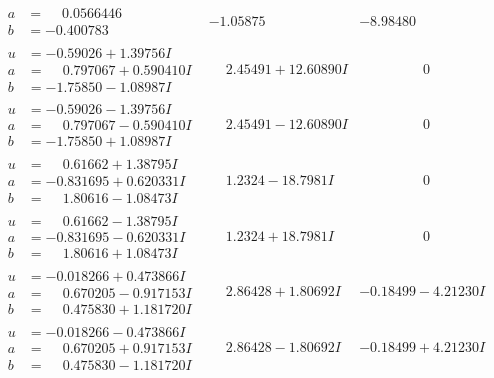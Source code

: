 \documentclass[1p]{elsarticle_modified}
\theoremstyle{definition}
\begin{document}
$$\begin{array}{c|c|c}
\begin{aligned}
a &= \phantom{-}0.0566446\phantom{ +0.000000I} \\
b &= -0.400783\phantom{ +0.000000I}\end{aligned}
 & -1.05875\phantom{ +0.000000I} & -8.98480\phantom{ +0.000000I} \\ \hline\begin{aligned}
u &= -0.59026 + 1.39756 I \\
a &= \phantom{-}0.797067 + 0.590410 I \\
b &= -1.75850 - 1.08987 I\end{aligned}
 & \phantom{-}2.45491 + 12.60890 I & \phantom{-0.000000 } 0 \\ \hline\begin{aligned}
u &= -0.59026 - 1.39756 I \\
a &= \phantom{-}0.797067 - 0.590410 I \\
b &= -1.75850 + 1.08987 I\end{aligned}
 & \phantom{-}2.45491 - 12.60890 I & \phantom{-0.000000 } 0 \\ \hline\begin{aligned}
u &= \phantom{-}0.61662 + 1.38795 I \\
a &= -0.831695 + 0.620331 I \\
b &= \phantom{-}1.80616 - 1.08473 I\end{aligned}
 & \phantom{-}1.2324 - 18.7981 I & \phantom{-0.000000 } 0 \\ \hline\begin{aligned}
u &= \phantom{-}0.61662 - 1.38795 I \\
a &= -0.831695 - 0.620331 I \\
b &= \phantom{-}1.80616 + 1.08473 I\end{aligned}
 & \phantom{-}1.2324 + 18.7981 I & \phantom{-0.000000 } 0 \\ \hline\begin{aligned}
u &= -0.018266 + 0.473866 I \\
a &= \phantom{-}0.670205 - 0.917153 I \\
b &= \phantom{-}0.475830 + 1.181720 I\end{aligned}
 & \phantom{-}2.86428 + 1.80692 I & -0.18499 - 4.21230 I \\ \hline\begin{aligned}
u &= -0.018266 - 0.473866 I \\
a &= \phantom{-}0.670205 + 0.917153 I \\
b &= \phantom{-}0.475830 - 1.181720 I\end{aligned}
 & \phantom{-}2.86428 - 1.80692 I & -0.18499 + 4.21230 I\\

\end{array}$$
\end{document}
